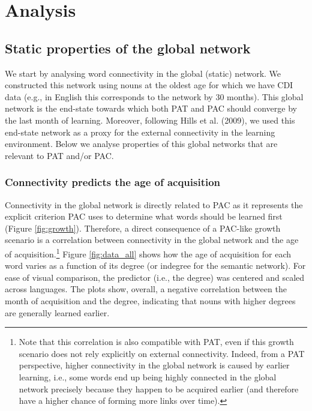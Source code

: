 \documentclass[10pt, letterpaper]{article}
\begin{document}
\section{Analysis}\label{analysis}

\subsection{Static properties of the global
network}\label{static-properties-of-the-global-network}

We start by analysing word connectivity in the global (static) network.
We constructed this network using nouns at the oldest age for which we
have CDI data (e.g., in English this corresponds to the network by 30
months). This global network is the end-state towards which both PAT and
PAC should converge by the last month of learning. Moreover, following
Hills et al. (2009), we used this end-state network as a proxy for the
external connectivity in the learning environment. Below we analyse
properties of this global networks that are relevant to PAT and/or PAC.

\subsubsection{Connectivity predicts the age of
acquisition}\label{connectivity-predicts-the-age-of-acquisition}

Connectivity in the global network is directly related to PAC as it
represents the explicit criterion PAC uses to determine what words
should be learned first (Figure \ref{fig:growth}). Therefore, a direct
consequence of a PAC-like growth scenario is a correlation between
connectivity in the global network and the age of
acquisition.\footnote{Note that this correlation is also compatible with PAT, even if this growth scenario does not rely explicitly on external connectivity. Indeed, from a PAT perspective, higher connectivity in the global network is caused by earlier learning, i.e., some words end up being highly connected in the global network precisely because they happen to be acquired earlier (and therefore have a higher chance of forming more links over time).}
Figure \ref{fig:data_all} shows how the age of acquisition for each word
varies as a function of its degree (or indegree for the semantic
network). For ease of visual comparison, the predictor (i.e., the
degree) was centered and scaled across languages. The plots show,
overall, a negative correlation between the month of acquisition and the
degree, indicating that nouns with higher degrees are generally learned
earlier.
\end{document}
